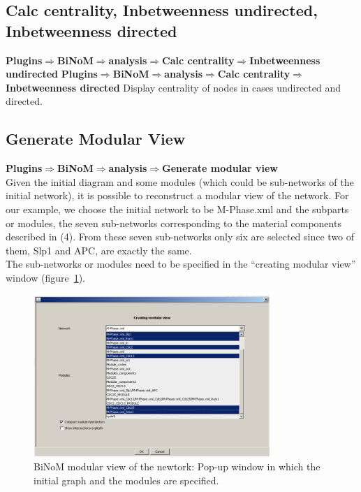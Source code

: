 \subsection{Calc centrality, Inbetweenness undirected, Inbetweenness directed}
\textbf{Plugins$\Rightarrow$BiNoM$\Rightarrow$analysis$\Rightarrow$Calc centrality$\Rightarrow$Inbetweenness undirected}
\textbf{Plugins$\Rightarrow$BiNoM$\Rightarrow$analysis$\Rightarrow$Calc centrality$\Rightarrow$Inbetweenness directed}
Display centrality of nodes in cases undirected and directed.

\subsection{Generate Modular View}
\textbf{Plugins$\Rightarrow$BiNoM$\Rightarrow$analysis$\Rightarrow$Generate modular view}\\
Given the initial diagram and some modules (which could be sub-networks of the initial network), it is possible to reconstruct a modular view of the network. For our example, we choose the initial network to be M-Phase.xml and the subparts or modules, the seven sub-networks corresponding to the material components described in (4). From these seven sub-networks only six are selected since two of them, Slp1 and APC, are exactly the same.\\
The sub-networks or modules need to be specified in the “creating modular view” window (figure~\ref{Modular_view_Pop-up_window}).\\
\begin{figure}
\centering
\includegraphics[width=0.8\textwidth]{graphics/Modular_view_Pop-up_window}
\caption{BiNoM modular view of the newtork: Pop-up window in which the initial graph and the modules are specified. }
\label{Modular_view_Pop-up_window}
\end{figure}
